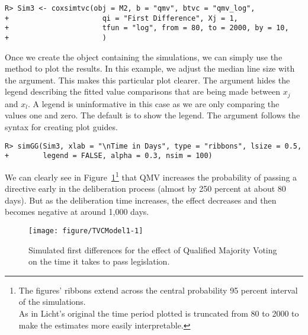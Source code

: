 \documentclass[nojss]{jss}\usepackage[]{graphicx}\usepackage[]{color}
\makeatletter
\newenvironment{kframe}{%
 \def\at@end@of@kframe{}%
 \ifinner\ifhmode%
  \def\at@end@of@kframe{\end{minipage}}%
  \begin{minipage}{\columnwidth}%
 \fi\fi%
 \def\FrameCommand##1{\hskip\@totalleftmargin \hskip-\fboxsep
 \colorbox{shadecolor}{##1}\hskip-\fboxsep
     \hskip-\linewidth \hskip-\@totalleftmargin \hskip\columnwidth}%
 \MakeFramed {\advance\hsize-\width
   \@totalleftmargin\z@ \linewidth\hsize
   \@setminipage}}%
 {\par\unskip\endMakeFramed%
 \at@end@of@kframe}
\newenvironment{knitrout}{}{} %
\makeatother
\begin{document}
\begin{knitrout}
\color{fgcolor}\begin{kframe}
\begin{verbatim}
R> Sim3 <- coxsimtvc(obj = M2, b = "qmv", btvc = "qmv_log",
+                      qi = "First Difference", Xj = 1,
+                      tfun = "log", from = 80, to = 2000, by = 10,
+                      )
\end{verbatim}
\end{kframe}
\end{knitrout}

Once we create the  object containing the simulations, we can simply use the  method to plot the results. In this example, we adjust the median line size with the  argument. This makes this particular plot clearer. The  argument hides the legend describing the fitted value comparisons that are being made between $x_{j}$ and $x_{l}$. A legend is uninformative in this case as we are only comparing the values one and zero. The default is to show the legend. The  argument follows the  syntax for creating plot guides.

\begin{knitrout}
\color{fgcolor}\begin{kframe}
\begin{verbatim}
R> simGG(Sim3, xlab = "\nTime in Days", type = "ribbons", lsize = 0.5,
+        legend = FALSE, alpha = 0.3, nsim = 100)
\end{verbatim}
\end{kframe}
\end{knitrout}

We can clearly see in Figure~\ref{TVCQMV}\footnote{The figures' ribbons extend across the central probability 95 percent interval of the simulations. \\ As in Licht's \citeyearpar{Licht2011} original the time period plotted is truncated from 80 to 2000 to make the estimates more easily interpretable.} that QMV increases the probability of passing a directive early in the deliberation process (almost by 250 percent at about 80 days). But as the deliberation time increases, the effect decreases and then becomes negative at around 1,000 days.

\begin{figure}

\begin{knitrout}
\color{fgcolor}

{\centering \texttt{[image: figure/TVCModel1-1]} 

}



\end{knitrout}

    \caption{Simulated first differences for the effect of Qualified Majority Voting on the time it takes to pass legislation.}
    \label{TVCQMV}

\end{figure}
\end{document}
